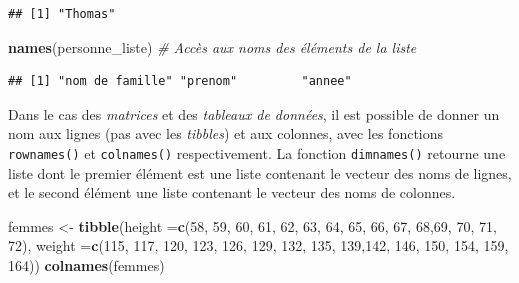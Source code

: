 \documentclass[
  11pt,
]{book}
\newenvironment{Shaded}{\begin{snugshade}}{\end{snugshade}}
\newcommand{\CommentTok}[1]{\textcolor[rgb]{0.56,0.35,0.01}{\textit{#1}}}
\newcommand{\DataTypeTok}[1]{\textcolor[rgb]{0.13,0.29,0.53}{#1}}
\newcommand{\DecValTok}[1]{\textcolor[rgb]{0.00,0.00,0.81}{#1}}
\newcommand{\KeywordTok}[1]{\textcolor[rgb]{0.13,0.29,0.53}{\textbf{#1}}}
\newcommand{\NormalTok}[1]{#1}
\newcommand{\StringTok}[1]{\textcolor[rgb]{0.31,0.60,0.02}{#1}}
\numberwithin{equation}{section}
\numberwithin{countremarque}{section}
\begin{document}
\begin{lstlisting}
## [1] "Thomas"
\end{lstlisting}

\begin{Shaded}
\begin{Highlighting}[]
\KeywordTok{names}\NormalTok{(personne\_liste)  }\CommentTok{\# Accès aux noms des éléments de la liste}
\end{Highlighting}
\end{Shaded}

\begin{lstlisting}
## [1] "nom de famille" "prenom"         "annee"
\end{lstlisting}

Dans le cas des \emph{matrices} et des \emph{tableaux de données}, il est possible de donner un nom aux lignes (pas avec les \emph{tibbles}) et aux colonnes, avec les fonctions \texttt{rownames()} et \texttt{colnames()} respectivement. La fonction \texttt{dimnames()} retourne une liste dont le premier élément est une liste contenant le vecteur des noms de lignes, et le second élément une liste contenant le vecteur des noms de colonnes.

\begin{Shaded}
\begin{Highlighting}[]
\NormalTok{femmes \textless{}{-}}
\StringTok{  }\KeywordTok{tibble}\NormalTok{(}\DataTypeTok{height =}\KeywordTok{c}\NormalTok{(}\DecValTok{58}\NormalTok{, }\DecValTok{59}\NormalTok{, }\DecValTok{60}\NormalTok{, }\DecValTok{61}\NormalTok{, }\DecValTok{62}\NormalTok{, }\DecValTok{63}\NormalTok{, }\DecValTok{64}\NormalTok{, }\DecValTok{65}\NormalTok{, }\DecValTok{66}\NormalTok{,}
                   \DecValTok{67}\NormalTok{, }\DecValTok{68}\NormalTok{,}\DecValTok{69}\NormalTok{, }\DecValTok{70}\NormalTok{, }\DecValTok{71}\NormalTok{, }\DecValTok{72}\NormalTok{),}
         \DataTypeTok{weight =}\KeywordTok{c}\NormalTok{(}\DecValTok{115}\NormalTok{, }\DecValTok{117}\NormalTok{, }\DecValTok{120}\NormalTok{, }\DecValTok{123}\NormalTok{, }\DecValTok{126}\NormalTok{, }\DecValTok{129}\NormalTok{, }\DecValTok{132}\NormalTok{, }
                   \DecValTok{135}\NormalTok{, }\DecValTok{139}\NormalTok{,}\DecValTok{142}\NormalTok{, }\DecValTok{146}\NormalTok{, }\DecValTok{150}\NormalTok{, }\DecValTok{154}\NormalTok{, }\DecValTok{159}\NormalTok{, }\DecValTok{164}\NormalTok{))}
\KeywordTok{colnames}\NormalTok{(femmes)}
\end{Highlighting}
\end{Shaded}
\end{document}
